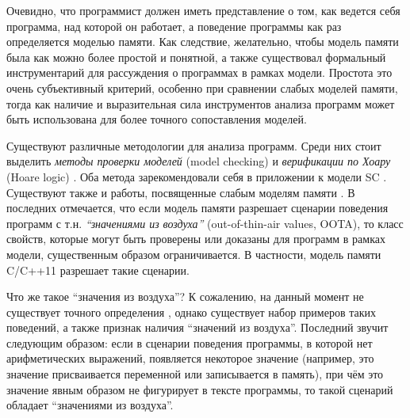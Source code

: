 Очевидно, что программист должен иметь представление о том, как ведется себя программа, над
которой он работает, а поведение программы как раз определяется моделью памяти.
Как следствие, желательно, чтобы модель памяти была как можно более простой и понятной,
а также существовал формальный инструментарий для рассуждения о программах в рамках модели.
Простота это очень субъективный критерий, особенно при сравнении слабых моделей памяти,
тогда как наличие и выразительная сила инструментов анализа программ может быть
использована для более точного сопоставления моделей.

Существуют различные методологии для анализа программ.
Среди них стоит выделить \emph{методы проверки моделей} (model checking) \cite{Peled-al:BOOK08,Clarke-al:BOOK99} и
\emph{верификации по Хоару} (Hoare logic) \cite{Hoare:CACM69}.
Оба метода зарекомендовали себя в приложении к модели SC
\cite{Owicki-Gries:AI76,Owicki-Gries:CACM76,OHearn:CONCUR04,Bornat-al:POPL05,Hobor-al:ESOP08,Dockins-al:ENTCS08,
Hobor-Gherghina:ESOP11,Gotsman-al:APLAS07,Jacobs-Piessens:POPL11,Svendsen-Birkedal:ESOP14,DinsdaleYoung-al:ECOOP10,Jung-al:POPL15,
LeyWild-Nanevski:POPL13,Sergey-al:PLDI15,Vechev-al:STTT13,Raychev-al:SAS13}.
Существуют также и работы, посвященные слабым моделям памяти
\cite{Kaiser-al:ECOOP17,Vafeiadis-Narayan:OOPSLA13,Turon-al:OOPSLA14,Lahav-Vafeiadis:ICALP15,Meshman-al:FMCAD15,Dan-al:SAS13}.
В последних отмечается, что если модель памяти разрешает сценарии поведения программ с т.н.
\emph{``значениями из воздуха''} (out-of-thin-air values, OOTA),
то класс свойств, которые могут быть проверены или доказаны для программ в рамках модели, существенным образом ограничивается.
В частности, модель памяти C/C++11 разрешает такие сценарии.

Что же такое ``значения из воздуха''? К сожалению, на данный момент не существует точного определения \cite{Boehm-Demsky:MSPC14},
однако существует набор примеров таких поведений, а также признак наличия ``значений из воздуха''.
Последний звучит следующим образом: если в сценарии поведения программы, в которой нет арифметических выражений,
появляется некоторое значение (например, это значение присваивается переменной или записывается в память), при чём это
значение явным образом не фигурирует в тексте программы, то такой сценарий обладает ``значениями из воздуха''.

